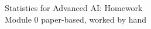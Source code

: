 \documentclass[11pt]{article}
\begin{document}
\begin{center}
{\LARGE Statistics for Advanced AI: Homework}\\[0.4em]
{\large Module 0 \textperiodcentered{} paper-based, worked by hand}
\end{center}



\end{document}
